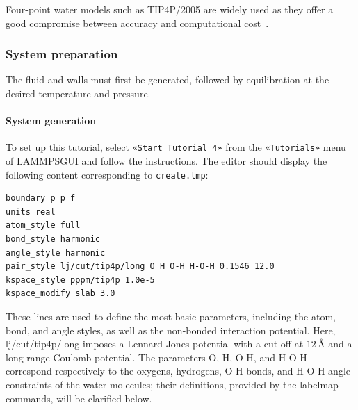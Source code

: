 \documentclass[9pt,tutorial]{livecoms}
\newcommand{\lmpcmd}[1]{\hspace{0pt}\colorbox{listing}{\textcolor{command}{\small{#1}}}\hspace{0pt}} %
\newcommand{\flecmd}[1]{\textcolor{command}{\texttt{#1}}} %
\newcommand{\guicmd}[1]{\textcolor{command}{\texttt{«#1»}}} %
\newcommand{\lammpsgui}{\textsf{LAMMPS\textendash GUI}}
\begin{document}
\begin{note}
Four-point water models such as TIP4P/2005 are widely used as they offer a
good compromise between accuracy and computational cost~\cite{kadaoluwa2021systematic}.
\end{note}

\subsubsection{System preparation}

The fluid and walls must first be generated, followed by equilibration at the
desired temperature and pressure.

\paragraph{System generation}

To set up this tutorial, select \guicmd{Start Tutorial 4} from the
\guicmd{Tutorials} menu of \lammpsgui{} and follow the instructions.
The editor should display the following content corresponding to \flecmd{create.lmp}:
\begin{lstlisting}
boundary p p f
units real
atom_style full
bond_style harmonic
angle_style harmonic
pair_style lj/cut/tip4p/long O H O-H H-O-H 0.1546 12.0
kspace_style pppm/tip4p 1.0e-5
kspace_modify slab 3.0
\end{lstlisting}
These lines are used to define the most basic parameters, including the
atom, bond, and angle styles, as well as {\color{blue}the non-bonded} interaction
potential.  Here, \lmpcmd{lj/cut/tip4p/long} imposes a Lennard-Jones potential with
a cut-off at $12\,\text{\AA{}}$ and a long-range Coulomb potential.  {\color{blue}
The parameters \lmpcmd{O}, \lmpcmd{H}, \lmpcmd{O-H}, and \lmpcmd{H-O-H} correspond
respectively to the oxygens, hydrogens, O-H bonds, and H-O-H angle constraints of
the water molecules; their definitions, provided by the \lmpcmd{labelmap} commands,
will be clarified below.}
\end{document}
